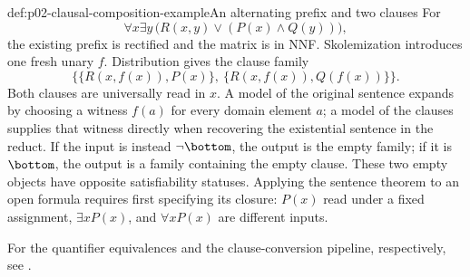 \begin{hbexample}{def:p02-clausal-composition-example}{An alternating prefix and two clauses}
For
\[
 \forall x\exists y\,\bigl(R(x,y)\lor(P(x)\land Q(y))\bigr),
\]
the existing prefix is rectified and the matrix is in NNF.
Skolemization introduces one fresh unary \(f\).  Distribution gives
the clause family
\[
 \bigl\{\{R(x,f(x)),P(x)\},\
         \{R(x,f(x)),Q(f(x))\}\bigr\}.
\]
Both clauses are universally read in \(x\).  A model of the original
sentence expands by choosing a witness \(f(a)\) for every domain element
\(a\); a model of the clauses supplies that witness directly when
recovering the existential sentence in the reduct.
If the input is instead \(\neg\bottom\), the output is the empty
family; if it is \(\bottom\), the output is a family containing the
empty clause.  These two empty objects have opposite satisfiability
statuses.  Applying the sentence theorem to an open formula requires
first specifying its closure: \(P(x)\) read under a fixed assignment,
\(\exists xP(x)\), and \(\forall xP(x)\) are different inputs.
\end{hbexample}
For the quantifier equivalences and the clause-conversion pipeline,
respectively, see \cite{Enderton2001,BaazEglyLeitsch2001}.
